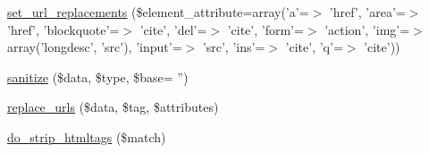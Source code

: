 \begin{DoxyCompactItemize}
\item 
\hyperlink{class_simple_pie___sanitize_a35f390c0ecd9d5b7742d9cbb9413265c}{set\-\_\-url\-\_\-replacements} (\$element\-\_\-attribute=array('a'=$>$ 'href', 'area'=$>$ 'href', 'blockquote'=$>$ 'cite', 'del'=$>$ 'cite', 'form'=$>$ 'action', 'img'=$>$ array('longdesc', 'src'), 'input'=$>$ 'src', 'ins'=$>$ 'cite', 'q'=$>$ 'cite'))
\item 
\hyperlink{class_simple_pie___sanitize_a0f5ce5372c38023bf06bcbcb5b8c7ffd}{sanitize} (\$data, \$type, \$base= '')
\item 
\hyperlink{class_simple_pie___sanitize_a9dbd8138db70011c44f14eb7d68b0062}{replace\-\_\-urls} (\$data, \$tag, \$attributes)
\item 
\hyperlink{class_simple_pie___sanitize_a5dbb73c1c14c999bf123e00306590417}{do\-\_\-strip\-\_\-htmltags} (\$match)
\end{DoxyCompactItemize}
